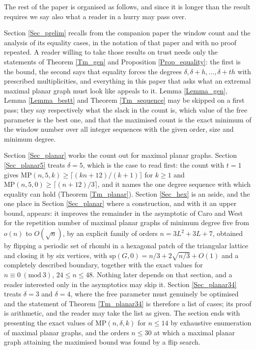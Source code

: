 \documentclass[12pt,a4paper]{article}%
\begin{document}

The rest of the paper is organised as follows, and since it is longer than the result requires we say
also what a reader in a hurry may pass over.

Section \ref{Sec_prelim} recalls from the companion paper \cite{P1} the window count and the analysis of
its equality cases, in the notation of that paper and with no proof repeated. A reader willing to take
those results on trust needs only the statements of Theorem \ref{Tm_gen} and Proposition
\ref{Prop_equality}: the first is the bound, the second says that equality forces the degrees
$\delta ,\delta +h,\ldots ,\delta +th$ with prescribed multiplicities, and everything in this paper that
asks what an extremal maximal planar graph must look like appeals to it. Lemma \ref{Lemma_gen}, Lemma
\ref{Lemma_bestt} and Theorem \ref{Tm_sequence} may be skipped on a first pass; they say respectively
what the slack in the count is, which value of the free parameter is the best one, and that the
maximised count is the exact minimum of the window number over all integer sequences with the given
order, size and minimum degree.

Section \ref{Sec_planar} works the count out for maximal planar graphs. Section \ref{Sec_planar5} treats
$\delta =5$, which is the case to read first: the count with $t=1$ gives
$\mathrm{MP}(n,5,k)\geq \lceil (kn+12)/(k+1)\rceil $ for $k\geq 1$ and
$\mathrm{MP}(n,5,0)\geq \lceil (n+12)/3\rceil $, and it names the one degree sequence with which
equality can hold (Theorem \ref{Tm_planar}). Section \ref{Sec_hex} is an aside, and the one place in Section \ref{Sec_planar} where a construction,
and with it an upper bound, appears: it improves the remainder in the asymptotic of Caro and West
\cite{CaroWest} for the repetition number of maximal planar graphs of minimum degree five from $o(n)$ to
$O(\sqrt{n})$, by an explicit family of orders $n=3L^{2}+3L+7$, obtained by
flipping a periodic set of rhombi in a hexagonal patch of the triangular lattice and closing it by six
vertices, with $\mathrm{sp}(G,0)=n/3+2\sqrt{n/3}+O(1)$ and a completely described boundary, together
with the exact values for $n\equiv 0\ (\mathrm{mod}\ 3)$, $24\leq n\leq 48$. Nothing later depends on
that section, and a reader interested only in the asymptotics may skip it. Section \ref{Sec_planar34} treats $\delta =3$ and $\delta =4$, where the free parameter
must genuinely be optimised and the statement of Theorem \ref{Tm_planar34} is therefore a list of cases;
its proof is arithmetic, and the reader may take the list as given. The section ends with presenting the exact values of $\mathrm{MP}(n,\delta ,k)$ for $n\leq 14$ by
exhaustive enumeration of maximal planar graphs, and the orders $n\leq 30$ at which a maximal planar graph attaining
the maximised bound was found by a flip search.
\end{document}

